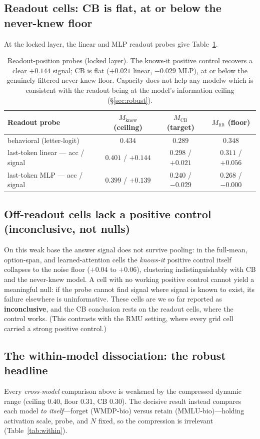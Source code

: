 \documentclass[11pt]{article}
\newcommand{\Mcb}{M_{\mathrm{CB}}}
\newcommand{\Mknows}{M_{\mathrm{know}}}
\newcommand{\Mnever}{M_{\mathrm{filt}}}
\begin{document}
\subsection{Readout cells: CB is flat, at or below the never-knew floor}
At the locked layer, the linear and MLP readout probes give Table~\ref{tab:readout}.
 
\begin{table}[h]
\centering
\small
\begin{tabular}{lccc}
\toprule
Readout probe & $\Mknows$ (ceiling) & $\Mcb$ (target) & $\Mnever$ (floor) \\
\midrule
behavioral (letter-logit) & $0.434$ & $0.289$ & $0.348$ \\
last-token linear --- acc / signal & $0.401$ / $\mathbf{+0.144}$ & $0.298$ / $\mathbf{+0.021}$ & $0.311$ / $+0.056$ \\
last-token MLP --- acc / signal & $0.399$ / $+0.139$ & $0.240$ / $-0.029$ & $0.268$ / $-0.000$ \\
\bottomrule
\end{tabular}
\caption{Readout-position probes (locked layer). The knows-it positive control recovers a clear
$+0.144$ signal; CB is flat ($+0.021$ linear, $-0.029$ MLP), at or below the genuinely-filtered
never-knew floor. Capacity does not help any modelw which is consistent with the readout being at the
model's information ceiling (\S\ref{sec:robust}).}
\label{tab:readout}
\end{table}
\subsection{Off-readout cells lack a positive control (inconclusive, not nulls)}
On this weak base the answer signal does not survive pooling: in the full-mean, option-span, and
learned-attention cells the \emph{knows-it} positive control itself collapses to the noise floor
($+0.04$ to $+0.06$), clustering indistinguishably with CB and the never-knew model. A cell with
no working positive control cannot yield a meaningful null: if the probe cannot find signal where
signal is known to exist, its failure elsewhere is uninformative. These cells are we so far
reported as \textbf{inconclusive}, and the CB conclusion rests on the readout cells, where the
control works. (This contrasts with the RMU setting, where every grid cell carried a strong
positive control.)

\subsection{The within-model dissociation: the robust headline}
Every \emph{cross-model} comparison above is weakened by the compressed dynamic range (ceiling
$0.40$, floor $0.31$, CB $0.30$). The decisive result instead compares each model
\emph{to itself}---forget (WMDP-bio) versus retain (MMLU-bio)---holding activation scale, probe,
and $N$ fixed, so the compression is irrelevant (Table~\ref{tab:within}).
 
\end{document}
